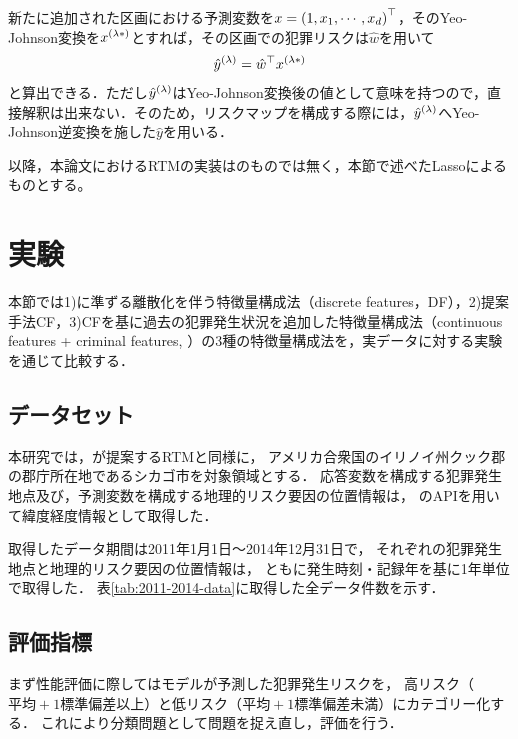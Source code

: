 新たに追加された区画における予測変数を$x={(1, x_1, \cdots, x_d)}^\top$，そのYeo-Johnson変換を${x}^{(\lambda*)}$とすれば，その区画での犯罪リスクは$\hat w$を用いて
\begin{align*}
 {{\hat y}^{(\lambda)}} = {\hat w}^\top {x}^{(\lambda*)}
\end{align*}
と算出できる．ただし${\hat y}^{(\lambda)}$はYeo-Johnson変換後の値として意味を持つので，直接解釈は出来ない．そのため，リスクマップを構成する際には，${\hat y}^{(\lambda)}$へYeo-Johnson逆変換を施した$\hat y$を用いる．

 
以降，本論文におけるRTMの実装は\cite{caplan2015risk}のものでは無く，本節で述べたLassoによるものとする。



\section{実験}

本節では1)\cite{caplan2015risk}に準ずる離散化を伴う特徴量構成法（discrete features，DF），2)提案手法CF，3)CFを基に過去の犯罪発生状況\cite{大山智也2020日本}を追加した特徴量構成法（continuous features + criminal features, \cfsq）の3種の特徴量構成法を，実データに対する実験を通じて比較する．

\subsection{データセット}
本研究では，\cite{caplan2015risk}が提案するRTMと同様に，
アメリカ合衆国のイリノイ州クック郡の郡庁所在地であるシカゴ市を対象領域とする．
応答変数を構成する犯罪発生地点及び，予測変数を構成する地理的リスク要因の位置情報は，
\cite{ChicagoDataPortal}のAPIを用いて緯度経度情報として取得した．

取得したデータ期間は2011年1月1日〜2014年12月31日で，
それぞれの犯罪発生地点と地理的リスク要因の位置情報は，
ともに発生時刻・記録年を基に1年単位で取得した．
表\ref{tab:2011-2014-data}に取得した全データ件数を示す．



\subsection{評価指標}\label{sec:criteria}
まず性能評価に際してはモデルが予測した犯罪発生リスクを，
高リスク（$平均+1標準偏差以上$）と低リスク（$平均+1標準偏差未満$）にカテゴリー化する．
これにより分類問題として問題を捉え直し，評価を行う．

